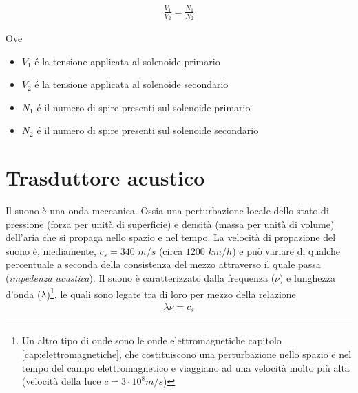 \documentclass[17pt]{extarticle}
\begin{document}
\begin{enumerate}
\begin{eqnarray}
	\frac{V_1}{V_2} = \frac{N_1}{N_2}
\end{eqnarray}

Ove




\begin{itemize}
	\item $V_1$ \'e la tensione applicata al solenoide primario
	\item $V_2$ \'e la tensione applicata al solenoide secondario
	\item $N_1$ \'e il numero di spire presenti sul solenoide primario
	\item $N_2$ \'e il numero di spire presenti sul solenoide secondario
\end{itemize}
\end{enumerate}
	


\section{Trasduttore acustico}\label{par:OndaMeccanica}


Il suono è una onda meccanica. Ossia una perturbazione locale dello stato di pressione (forza per unità di superficie) e densità (massa per unità di volume) dell'aria che si propaga nello spazio e nel tempo. La velocità di propazione del suono è, mediamente, $c_s = 340$ $m/s$ (circa $1200$ $km/h$) e può variare di qualche percentuale a seconda della consistenza del mezzo attraverso il quale passa (\emph{impedenza acustica}). Il suono è caratterizzato dalla frequenza ($\nu$) e lunghezza d'onda ($\lambda$)\footnote{Un altro tipo di onde sono le onde elettromagnetiche capitolo \ref{cap:elettromagnetiche}, che costituiscono una perturbazione nello spazio e nel tempo del campo elettromagnetico e viaggiano ad una velocità molto più alta (velocità della luce $c = 3\cdot 10^8m/s$)}, le quali sono legate tra di loro per mezzo della relazione
\begin{eqnarray}
	\lambda \nu = c_s
\end{eqnarray}
\end{document}
